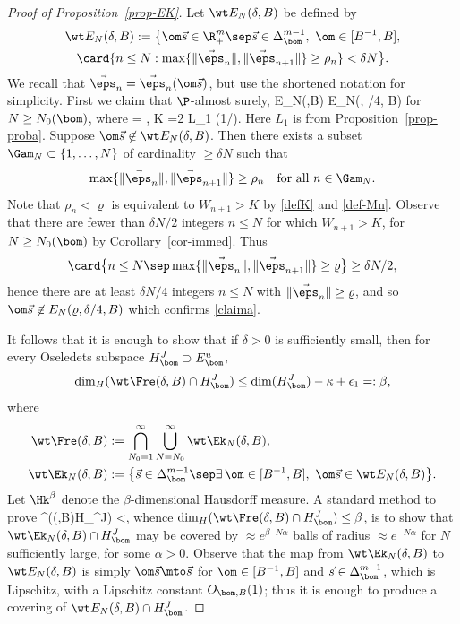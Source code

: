 \begin{proof}[Proof of Proposition~\ref{prop-EK}]
Let $\wt E_N(\delta,B)$ be defined by
\begin{multline*}
\wt E_N(\delta,B):=\bigl\{\om\vec s\in \R^m_+\sep \vec s\in \Delta_\bom^{m-1},\ \om\in [B^{-1},B],\\
\card\{n\le N: \max\{\|\vec\eps_{n}\|,\|\vec\eps_{{n+1}}\|\}\ge \rho_n\} <\delta N\bigr\}.
\end{multline*}
We recall that $\vec\eps_n =\vec\eps_n(\om\vec s)$, but use the shortened notation for simplicity.
First we claim that $\P$-almost surely,
\be \label{claima}
\wt E_N(\delta,B) \supset E_N(\varrho, \delta/4, B)
\ee
for $N\ge N_0(\bom)$, where
\be \label{defK}
\varrho = , \quad {}\quad K =2 L_1 \log(1/\delta).
\ee
Here $L_1$ is from Proposition~\ref{prop-proba}.
Suppose $\om\vec{s} \not\in \wt E_N(\delta,B)$. Then
there exists a subset $\Gam_N \subset \{1,\ldots,N\}$ of cardinality $\ge \delta N$ such that
\[
\max\{\|\vec\eps_{n}\|,\|\vec\eps_{{n+1}}\|\}\ge \rho_n\quad \text{for all }n \in \Gam_N.
\]
Note that $\rho_n < \varrho$ is equivalent to $W_{n+1} >K$ by \eqref{defK} and \eqref{def-Mn}.
Observe that
there are fewer than $\delta N/2$ integers $n\le N$ for which $W_{n+1}>K$, for $N\ge N_0(\bom)$ by Corollary~\ref{cor-immed}. Thus
\[
\card\bigl\{n\le N\sep \max\{\|\vec\eps_{n}\|,\|\vec\eps_{{n+1}}\|\}\ge \varrho \bigr\}\ge \delta N/2,
\]
hence there are at least $\delta N/4$ integers $n\le N$ with $\|\vec\eps_n\|\ge \varrho$, and so
$\om\vec{s}\not \in E_N(\varrho, \delta/4, B)$ which confirms \eqref{claima}.

It follows that it is enough to show that if $\delta>0$ is sufficiently small, then for every Oseledets subspace $H_\bom^J\supset E^u_\bom$,
\[
\dim_H(\wt\Fre(\delta,B)\cap H_\bom^J) \le \dim(H_\bom^J) - \kappa + \epsilon_1=:\beta,
\]
where
\begin{align*}
\wt\Fre(\delta,B)&:=\bigcap_{N_0=1}^\infty \bigcup_{N=N_0}^\infty \wt \Ek_N(\delta,B),\\
\wt \Ek_N(\delta,B) &:= \bigl\{\vec s\in \Delta_\bom^{m-1}\sep \exists\,\om\in[B^{-1},B],\ \om\vec s\in \wt E_N(\delta,B)\bigr\}.
\end{align*}
Let $\Hk^\beta$ denote the $\beta$-dimensional Hausdorff measure. A standard method to prove
\be \label{dimen}
\Hk^\beta(\wt\Fre(\delta,B)\cap H_\bom^J) <\infty,
\ee
whence $\dim_H(\wt\Fre(\delta,B)\cap H_\bom^J)\le \beta$,
is to show that $\wt \Ek_N(\delta,B)\cap H_\bom^J$ may be covered by $\approx e^{\beta\cdot N\alpha }$ balls of radius $\approx e^{-N\alpha}$ for $N$ sufficiently large, for some $\alpha>0$.
Observe that the map from $\wt \Ek_N(\delta,B)$ to $\wt E_N(\delta,B)$ is simply $\om\vec s\mto \vec s$ for $\om\in [B^{-1},B]$ and $\vec s\in \Delta_\bom^{m-1}$, which is Lipschitz, with a Lipschitz constant $O_{\bom,B}(1)$; thus it is enough to produce a covering of $\wt E_N(\delta,B)\cap H_\bom^J$.


\end{proof}
